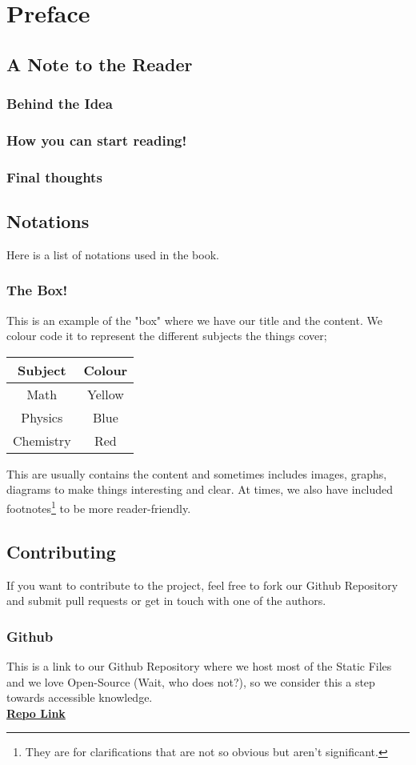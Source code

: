 \section{Preface}
\subsection{A Note to the Reader}
\subsubsection{Behind the Idea}
\subsubsection{How you can start reading!}
\subsubsection{Final thoughts}
\subsection{Notations}
Here is a list of notations used in the book.
\subsubsection{The Box!}
This is an example of the "box" where we have our title and the content. We colour code it to represent the different subjects the things cover;
\begin{flushleft}
\begin{tabular}{|c|c|}
\hline
Subject & Colour\\
\hline
Math & Yellow\\
Physics & Blue\\
Chemistry & Red\\
\hline
\end{tabular}
\end{flushleft}
\begin{guidebox}{}
{This are usually contains the content and sometimes includes images, graphs, diagrams to make things interesting and clear. At times, we also have included footnotes\footnote{They are for clarifications that are not so obvious but aren't significant.} to be more reader-friendly.}
\end{guidebox}
\subsection{Contributing}
If you want to contribute to the project, feel free to fork our Github Repository and submit pull requests or get in touch with one of the authors.
\subsubsection{Github}
This is a link to our Github Repository where we host most of the Static Files and we love Open-Source (Wait, who does not?), so we consider this a step towards accessible knowledge.\\
\textbf{\href{https://github.com/Psi25Omega/Thonk-M-P-C}{Repo Link}}
